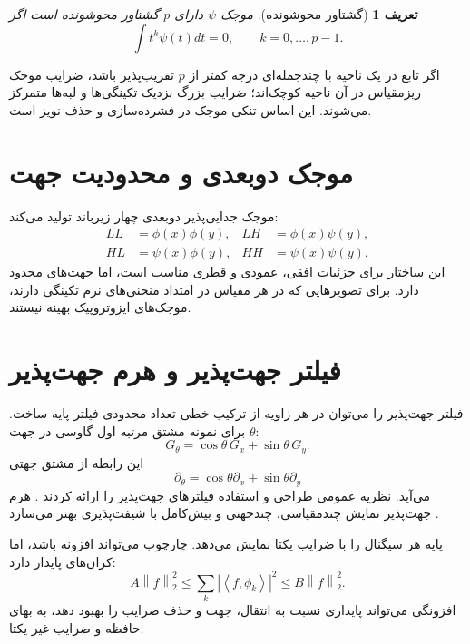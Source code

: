 \documentclass[12pt,openany,oneside]{book}
\newtheorem{definition}{تعریف}[chapter]
\newcommand{\norm}[1]{\left\lVert #1\right\rVert}
\newcommand{\inner}[2]{\left\langle #1,#2\right\rangle}
\begin{document}
\begin{definition}[گشتاور محوشونده]
موجک \(\psi\) دارای \(p\) گشتاور محوشونده است اگر
\begin{equation}
\int t^k\psi(t)dt=0,
\qquad k=0,\dots,p-1.
\end{equation}
\end{definition}

اگر تابع در یک ناحیه با چندجمله‌ای درجه کمتر از \(p\) تقریب‌پذیر باشد، ضرایب موجک ریزمقیاس در آن ناحیه
کوچک‌اند؛ ضرایب بزرگ نزدیک تکینگی‌ها و لبه‌ها متمرکز می‌شوند. این اساس تنکی موجک در فشرده‌سازی و حذف
نویز است.

\section{موجک دوبعدی و محدودیت جهت}

موجک جدایی‌پذیر دوبعدی چهار زیرباند تولید می‌کند:
\begin{align}
LL&=\phi(x)\phi(y),&
LH&=\phi(x)\psi(y),\\
HL&=\psi(x)\phi(y),&
HH&=\psi(x)\psi(y).
\end{align}
این ساختار برای جزئیات افقی، عمودی و قطری مناسب است، اما جهت‌های محدود دارد. برای تصویرهایی که در هر
مقیاس در امتداد منحنی‌های نرم تکینگی دارند، موجک‌های ایزوتروپیک بهینه نیستند.

\section{فیلتر جهت‌پذیر و هرم جهت‌پذیر}

فیلتر جهت‌پذیر را می‌توان در هر زاویه از ترکیب خطی تعداد محدودی فیلتر پایه ساخت. برای نمونه مشتق مرتبه اول
گاوسی در جهت \(\theta\):
\begin{equation}
G_\theta=\cos\theta\,G_x+\sin\theta\,G_y.
\label{eq:steer-first}
\end{equation}
این رابطه از مشتق جهتی
\begin{equation}
\partial_\theta=\cos\theta\partial_x+\sin\theta\partial_y
\end{equation}
می‌آید.  نظریه عمومی طراحی و استفاده فیلترهای جهت‌پذیر را ارائه کردند
\cite{freeman1991steerable}. هرم جهت‌پذیر  نمایش چندمقیاسی، چندجهتی و بیش‌کامل با
شیفت‌پذیری بهتر می‌سازد \cite{simoncelli1992shiftable,simoncelli1995pyramid}.

\begin{keybox}
پایه هر سیگنال را با ضرایب یکتا نمایش می‌دهد. چارچوب می‌تواند افزونه باشد، اما کران‌های پایدار دارد:
\begin{equation}
A\norm f_2^2\le\sum_k|\inner f{\phi_k}|^2\le B\norm f_2^2.
\end{equation}
افزونگی می‌تواند پایداری نسبت به انتقال، جهت و حذف ضرایب را بهبود دهد، به بهای حافظه و ضرایب غیر یکتا.
\end{keybox}
\end{document}
